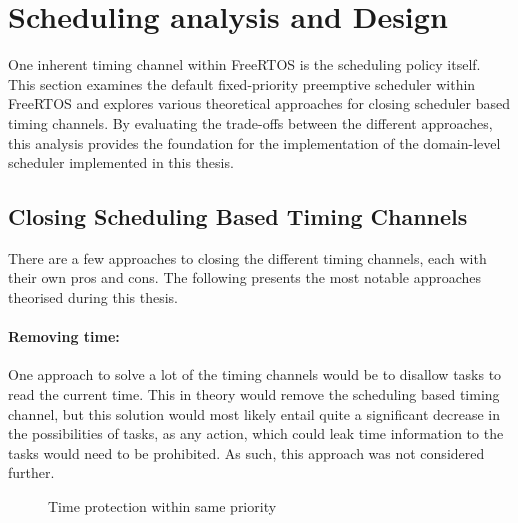 \section{Scheduling analysis and Design}\label{sec:Scheduling} %
One inherent timing channel within FreeRTOS is the scheduling policy itself.
This section examines the default fixed-priority preemptive scheduler within
FreeRTOS and explores various theoretical approaches for closing scheduler
based timing channels. By evaluating the trade-offs between the different
approaches, this analysis provides the foundation for the implementation of the
domain-level scheduler implemented in this thesis.

\subsection{Closing Scheduling Based Timing Channels}\label{sub:closing-sched}
There are a few approaches to closing the different timing channels, each with
their own pros and cons. The following presents the most notable approaches
theorised during this thesis.

\paragraph{Removing time:} One approach to solve a lot of the timing channels
would be to disallow tasks to read the current time. This in theory would
remove the scheduling based timing channel, but this solution would most likely
entail quite a significant decrease in the possibilities of tasks, as any
action, which could leak time information to the tasks would need to be
prohibited. As such, this approach was not considered further.

\begin{figure}
  \begin{center}
    
  \end{center}
  \caption{Time protection within same priority}\label{fig:prio_sched}
\end{figure}

